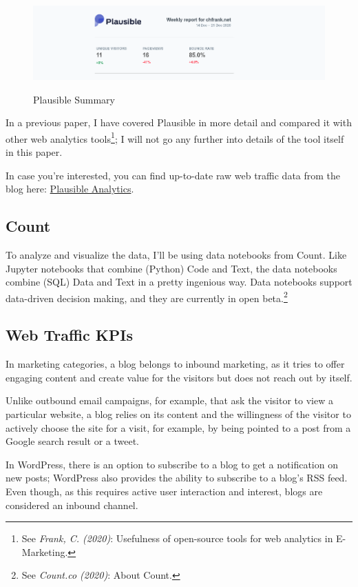 \begin{figure}[H]
\centering
\caption {Plausible Summary}
\includegraphics[width=\linewidth]{images/plausible.png}
\label{fig:plausibleSummary}
\end{figure}

In a previous paper, I have covered Plausible in more detail and compared it with other web analytics tools\footnote{See \textit{Frank, C. (2020)}: Usefulness of open-source tools for web analytics in E-Marketing.\cite{previousPaper}}; I will not go any further into details of the tool itself in this paper.

In case you're interested, you can find up-to-date raw web traffic data from the blog here: \href{https://plausible.io/chfrank.net}{Plausible Analytics}.

\subsection{Count}

To analyze and visualize the data, I'll be using data notebooks from Count. Like Jupyter notebooks that combine (Python) Code and Text, the data notebooks combine (SQL) Data and Text in a pretty ingenious way. Data notebooks support data-driven decision making, and they are currently in open beta.\footnote{See \textit{Count.co (2020)}: About Count.\cite{aboutCount}}

\subsection{Web Traffic KPIs}

In marketing categories, a blog belongs to inbound marketing, as it tries to offer engaging content and create value for the visitors but does not reach out by itself. 

Unlike outbound email campaigns, for example, that ask the visitor to view a particular website, a blog relies on its content and the willingness of the visitor to actively choose the site for a visit, for example, by being pointed to a post from a Google search result or a tweet.

In WordPress, there is an option to subscribe to a blog to get a notification on new posts; WordPress also provides the ability to subscribe to a blog's RSS feed. Even though, as this requires active user interaction and interest, blogs are considered an inbound channel.

